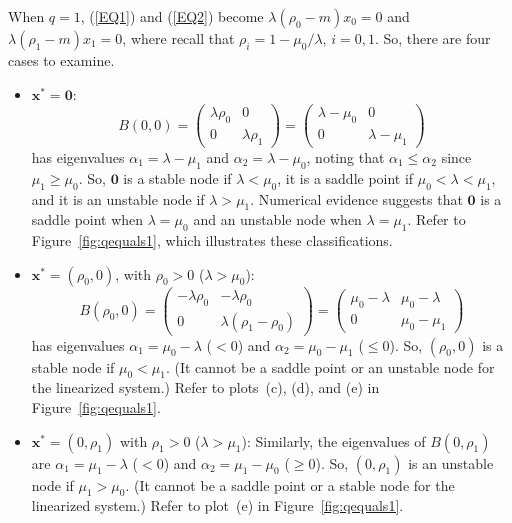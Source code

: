 \documentclass[12pt]{article}
\newcommand{\bzero}{\boldsymbol{0}}
\newcommand{\bx}{\boldsymbol{x}}
\begin{document}
When $q=1$, (\ref{EQ1}) and (\ref{EQ2}) become
$\lambda (\rho_0-m) x_0 = 0$ and
$\lambda (\rho_1-m) x_1 = 0$, where recall that
$\rho_i=1-\mu_0/\lambda$, $i=0,1$. So, there are four cases to examine.

\begin{itemize}
\item[(1)]
$\bx^*=\bzero$:
$$
B(0,0)=
\left(
\begin{matrix}
\lambda\rho_0 &0 \\
0             & \lambda\rho_1
\end{matrix}
\right)
=
\left(
\begin{matrix}
\lambda-\mu_0 &0 \\
0             & \lambda-\mu_1
\end{matrix}
\right)
$$
has eigenvalues $\alpha_1= \lambda-\mu_1$ and $\alpha_2= \lambda-\mu_0$,
noting that $\alpha_1\leq \alpha_2$ since $\mu_1\geq \mu_0$.
So, $\bzero$ is a stable node if $\lambda<\mu_0$,
it is a saddle point if $\mu_0<\lambda<\mu_1$,
and it is an unstable node if $\lambda>\mu_1$.
Numerical evidence suggests that
$\bzero$ is a saddle point when $\lambda=\mu_0$
and an unstable node when $\lambda=\mu_1$. Refer to Figure~\ref{fig:qequals1},
which illustrates these classifications.

\item[(2)]
$\bx^*=(\rho_0,0)$, with $\rho_0>0$ ($\lambda>\mu_0$):
$$
B(\rho_0,0)=
\left(
\begin{matrix}
-\lambda\rho_0 & -\lambda \rho_0 \\
0              & \lambda(\rho_1-\rho_0)
\end{matrix}
\right)
=
\left(
\begin{matrix}
\mu_0-\lambda & \mu_0-\lambda \\
0             & \mu_0-\mu_1
\end{matrix}
\right)
$$
has eigenvalues $\alpha_1=\mu_0-\lambda$ ($<0$) and
$\alpha_2=\mu_0-\mu_1$ ($\leq 0$).
So, $(\rho_0,0)$ is a stable node if $\mu_0<\mu_1$.
(It cannot be a saddle point or an unstable node for the
linearized system.)
Refer to plots~(c), (d), and (e) in 
Figure~\ref{fig:qequals1}.

\item[(3)]
$\bx^*=(0,\rho_1)$ with $\rho_1>0$ ($\lambda>\mu_1$):
Similarly, the eigenvalues of $B(0,\rho_1)$
are $\alpha_1=\mu_1-\lambda$ ($<0$) and 
$\alpha_2=\mu_1-\mu_0$ ($\geq 0$). So, $(0,\rho_1)$ is an unstable node
if $\mu_1>\mu_0$.
(It cannot be a saddle point or a stable node for the
linearized system.) Refer to plot~(e) in 
Figure~\ref{fig:qequals1}.


\end{itemize}
\end{document}
